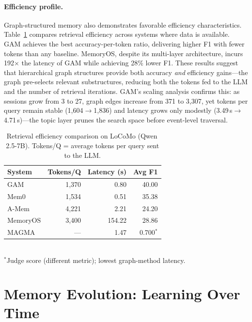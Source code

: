 \documentclass[hf]{ceurart}
\begin{document}
\paragraph{Efficiency profile.}
Graph-structured memory also demonstrates favorable efficiency
characteristics. Table~\ref{tab:efficiency} compares retrieval
efficiency across systems where data is available. GAM achieves the
best accuracy-per-token ratio, delivering higher F1 with fewer tokens
than any baseline. MemoryOS, despite its multi-layer architecture,
incurs 192$\times$ the latency of GAM while achieving 28\% lower F1.
These results suggest that hierarchical graph structures provide both
accuracy \emph{and} efficiency gains---the graph pre-selects relevant
substructures, reducing both the tokens fed to the LLM and the
number of retrieval iterations. GAM's scaling analysis confirms this:
as sessions grow from 3 to 27, graph edges increase from 371 to 3,307,
yet tokens per query remain stable (1,604$\to$1,836) and latency
grows only modestly (3.49\,s$\to$4.71\,s)---the topic layer prunes
the search space before event-level traversal.

\begin{table}[t]
\caption{Retrieval efficiency comparison on LoCoMo (Qwen\,2.5-7B).
  Tokens/Q = average tokens per query sent to the LLM.}
\label{tab:efficiency}
\centering\small
\begin{tabular}{@{}lrrr@{}}
\toprule
\textbf{System} & \textbf{Tokens/Q} & \textbf{Latency (s)} & \textbf{Avg F1} \\
\midrule
GAM & 1,370 & 0.80 & 40.00 \\
Mem0 & 1,534 & 0.51 & 35.38 \\
A-Mem & 4,221 & 2.21 & 24.20 \\
MemoryOS & 3,400 & 154.22 & 28.86 \\
MAGMA & --- & 1.47 & 0.700$^*$ \\
\bottomrule
\end{tabular}
\\[3pt]
\footnotesize $^*$Judge score (different metric); lowest graph-method latency.
\end{table}


\section{Memory Evolution: Learning Over Time}
\label{sec:evolution}
\end{document}
